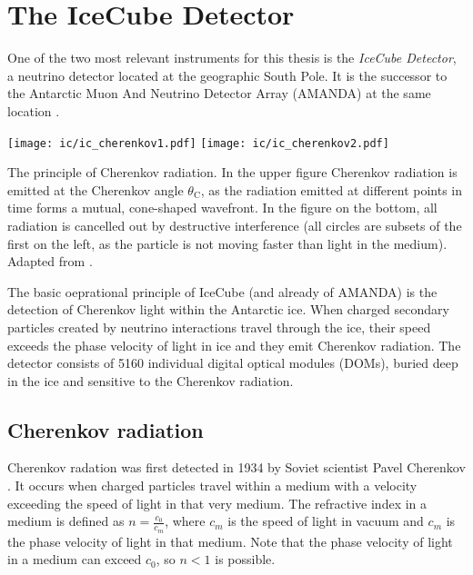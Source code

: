 \chapter{The IceCube Detector} \label{ic}
One of the two most relevant instruments for this thesis is the \textit{IceCube Detector}, a neutrino detector located at the geographic South Pole. It is the successor to the Antarctic Muon And Neutrino Detector Array (AMANDA) at the same location .
\begin{marginfigure}
    \texttt{[image: ic/ic\_cherenkov1.pdf]}
    \texttt{[image: ic/ic\_cherenkov2.pdf]}
    \caption[Cherenkov radiation]{The principle of Cherenkov radiation. In the upper figure Cherenkov radiation is emitted at the Cherenkov angle $\theta_\text{C}$, as the radiation emitted at different points in time forms a mutual, cone-shaped wavefront. In the figure on the bottom, all radiation is cancelled out by destructive interference (all circles are subsets of the first on the left, as the particle is not moving faster than light in the medium). Adapted from \cite{LAnnunziata2020}.}
\end{marginfigure}
The basic oeprational principle of IceCube (and already of AMANDA) is the detection of Cherenkov light within the Antarctic ice. When charged secondary particles created by neutrino interactions travel through the ice, their speed exceeds the phase velocity of light in ice and they emit Cherenkov radiation. The detector consists of 5160 individual digital optical modules (DOMs), buried deep in the ice and sensitive to the Cherenkov radiation.

\section{Cherenkov radiation} \label{cherenkov_radiation}

Cherenkov radation was first detected in 1934 by Soviet scientist Pavel Cherenkov . It occurs when charged particles travel within a medium with a velocity exceeding the speed of light in that very medium. The refractive index in a medium is defined as $n=\frac{c_0}{c_m}$, where $c_m$ is the speed of light in vacuum and $c_m$ is the phase velocity of light in that medium. Note that the phase velocity of light in a medium can exceed $c_0$, so $n<1$ is possible. 


